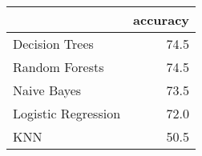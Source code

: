 \begin{tabular}{lr}
\toprule
{} &  accuracy \\
\midrule
Decision Trees      &      74.5 \\
Random Forests      &      74.5 \\
Naive Bayes         &      73.5 \\
Logistic Regression &      72.0 \\
KNN                 &      50.5 \\
\bottomrule
\end{tabular}

